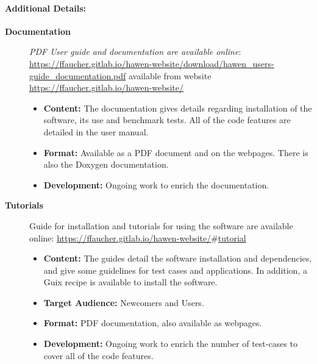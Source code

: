 \paragraph{Additional Details:}

\begin{description}
\item[\textbf{Documentation}] %
\emph{PDF User guide and documentation are available online}: \newline 
\href{https://ffaucher.gitlab.io/hawen-website/download/hawen_users-guide_documentation.pdf}
{https://ffaucher.gitlab.io/hawen-website/download/hawen\_users-guide\_documentation.pdf} available from website 
       \href{https://ffaucher.gitlab.io/hawen-website/}
            {https://ffaucher.gitlab.io/hawen-website/}

\begin{itemize}
\item \textbf{Content:} 
The documentation gives details regarding installation of the software, its use and benchmark tests.
All of the code features are detailed in the user manual.
\item \textbf{Format:} Available as a PDF document and on the webpages. There is also the Doxygen documentation.
\item \textbf{Development:} Ongoing work to enrich the documentation.
\end{itemize}



\item[\textbf{Tutorials}] Guide for installation and tutorials for using the software are available online: 
      \href{https://ffaucher.gitlab.io/hawen-website/#tutorial}{https://ffaucher.gitlab.io/hawen-website/$\#$tutorial}
\begin{itemize}
\item \textbf{Content:} The guides detail the software installation and dependencies, and give some guidelines for test cases and applications. In addition, a Guix recipe is available to install the 
software.
\item \textbf{Target Audience:} Newcomers and Users.
\item \textbf{Format:} PDF documentation, also available as webpages.
\item \textbf{Development:} Ongoing work to enrich the number of test-cases to cover all of the code features.
\end{itemize}

\end{description}



